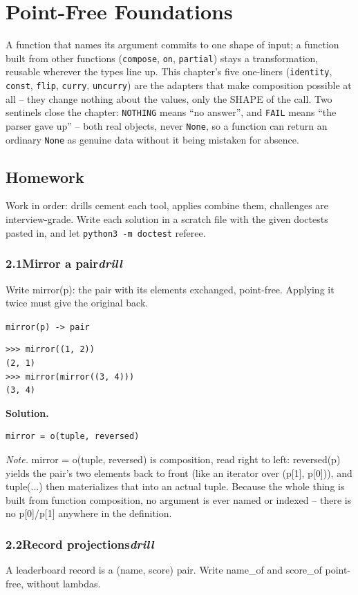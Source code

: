 \documentclass[10pt,letterpaper]{book}
\begin{document}
\chapter{Point-Free Foundations}

A function that names its argument commits to one shape of input; a function
built from other functions (\texttt{compose}, \texttt{on}, \texttt{partial})
stays a transformation, reusable wherever the types line up. This chapter's
five one-liners (\texttt{identity}, \texttt{const}, \texttt{flip},
\texttt{curry}, \texttt{uncurry}) are the adapters that make composition
possible at all -- they change nothing about the values, only the SHAPE of
the call. Two sentinels close the chapter: \texttt{NOTHING} means ``no
answer'', and \texttt{FAIL} means ``the parser gave up'' -- both real
objects, never \texttt{None}, so a function can return an ordinary
\texttt{None} as genuine data without it being mistaken for absence.
\section{Homework}
Work in order: drills cement each tool, applies combine them,
challenges are interview-grade. Write each solution in a scratch file with
the given doctests pasted in, and let \texttt{python3 -m doctest} referee.
\subsection*{2.1\quad Mirror a pair\hfill\textnormal{\textit{drill}}}
Write mirror(p): the pair with its elements exchanged, point-free. Applying it twice must give the original back.

\noindent\texttt{mirror(p) -> pair}
\begin{lstlisting}[style=ex]
>>> mirror((1, 2))
(2, 1)
>>> mirror(mirror((3, 4)))
(3, 4)
\end{lstlisting}
\noindent\textbf{Solution.}
\begin{lstlisting}[style=code]
mirror = o(tuple, reversed)
\end{lstlisting}
\noindent\textit{Note.} mirror = o(tuple, reversed) is composition, read right to left: reversed(p) yields the pair's two elements back to front (like an iterator over (p[1], p[0])), and tuple(...) then materializes that into an actual tuple. Because the whole thing is built from function composition, no argument is ever named or indexed -- there is no p[0]/p[1] anywhere in the definition.

\subsection*{2.2\quad Record projections\hfill\textnormal{\textit{drill}}}
A leaderboard record is a (name, score) pair. Write name\_of and score\_of point-free, without lambdas.
\end{document}

